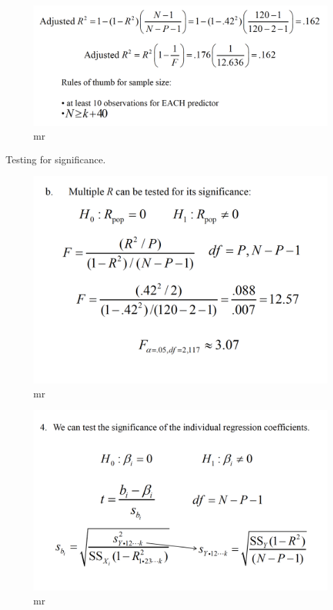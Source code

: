 \documentclass[]{book}
\theoremstyle{definition}
\theoremstyle{definition}
\theoremstyle{definition}
\theoremstyle{remark}
\begin{document}
\begin{figure}
\centering
\includegraphics{img/hicksmr10.png}
\caption{mr}
\end{figure}

Testing for significance.

\begin{figure}
\centering
\includegraphics{img/hicksmr11.png}
\caption{mr}
\end{figure}

\begin{figure}
\centering
\includegraphics{img/hicksmr12.png}
\caption{mr}
\end{figure}
\end{document}
